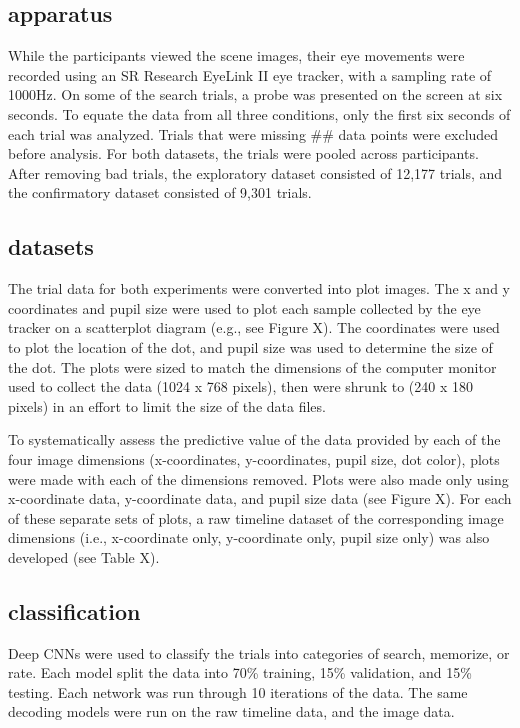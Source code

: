 \subsection{apparatus}
While the participants viewed the scene images, their eye movements were recorded using an SR Research EyeLink II eye tracker, with a sampling rate of 1000Hz. On some of the search trials, a probe was presented on the screen at six seconds. To equate the data from all three conditions, only the first six seconds of each trial was analyzed. Trials that were missing ## data points were excluded before analysis. For both datasets, the trials were pooled across participants. After removing bad trials, the exploratory dataset consisted of 12,177 trials, and the confirmatory dataset consisted of 9,301 trials.

\subsection{datasets}
The trial data for both experiments were converted into plot images. The x and y coordinates and pupil size were used to plot each sample collected by the eye tracker on a scatterplot diagram (e.g., see Figure X). The coordinates were used to plot the location of the dot, and pupil size was used to determine the size of the dot. The plots were sized to match the dimensions of the computer monitor used to collect the data (1024 x 768 pixels), then were shrunk to (240 x 180 pixels) in an effort to limit the size of the data files.


To systematically assess the predictive value of the data provided by each of the four image dimensions (x-coordinates, y-coordinates, pupil size, dot color), plots were made with each of the dimensions removed. Plots were also made only using x-coordinate data, y-coordinate data, and pupil size data (see Figure X). For each of these separate sets of plots, a raw timeline dataset of the corresponding image dimensions (i.e., x-coordinate only, y-coordinate only, pupil size only) was also developed (see Table X).


\subsection{classification}
Deep CNNs were used to classify the trials into categories of search, memorize, or rate. Each model split the data into 70\% training, 15\% validation, and 15\% testing. Each network was run through 10 iterations of the data. The same decoding models were run on the raw timeline data, and the image data.

